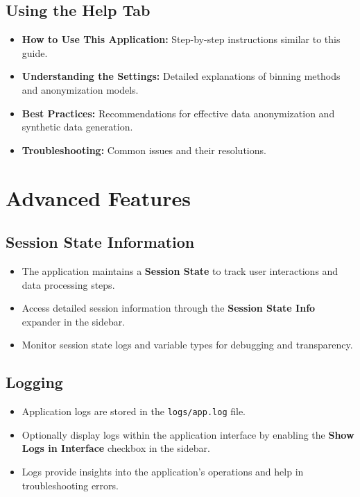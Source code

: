 \documentclass[12pt,a4paper]{article}
\begin{document}
\subsection{Using the Help Tab}
\begin{itemize}
    \item \textbf{How to Use This Application:} Step-by-step instructions similar to this guide.
    \item \textbf{Understanding the Settings:} Detailed explanations of binning methods and anonymization models.
    \item \textbf{Best Practices:} Recommendations for effective data anonymization and synthetic data generation.
    \item \textbf{Troubleshooting:} Common issues and their resolutions.
\end{itemize}

\section{Advanced Features}
\subsection{Session State Information}
\begin{itemize}
    \item The application maintains a \textbf{Session State} to track user interactions and data processing steps.
    \item Access detailed session information through the \textbf{Session State Info} expander in the sidebar.
    \item Monitor session state logs and variable types for debugging and transparency.
\end{itemize}

\subsection{Logging}
\begin{itemize}
    \item Application logs are stored in the \texttt{logs/app.log} file.
    \item Optionally display logs within the application interface by enabling the \textbf{Show Logs in Interface} checkbox in the sidebar.
    \item Logs provide insights into the application's operations and help in troubleshooting errors.
\end{itemize}
\end{document}
